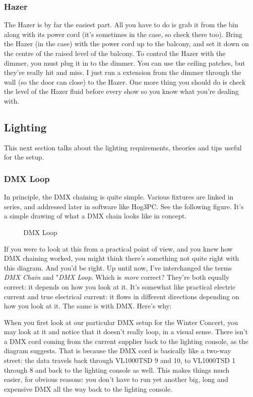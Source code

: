 \documentclass[letterpaper,10pt,oneside,headsepline]{scrreprt}
\begin{document}
\subsubsection{Hazer}
The Hazer is by far the easiest part. All you have to do is grab it from the bin along with its power cord (it's sometimes in the case, so check there too). Bring the Hazer (in the case) with the power cord up to the balcony, and set it down on the centre of the raised level of the balcony. To control the Hazer with the dimmer, you must plug it in to the dimmer. You can use the ceiling patches, but they're really hit and miss. I just run a extension from the dimmer through the wall (so the door can close) to the Hazer. One more thing you should do is check the level of the Hazer fluid before every show so you know what you're dealing with.
\subsection{Lighting}
This next section talks about the lighting requirements, theories and tips useful for the setup.
\subsubsection{DMX Loop}
In principle, the DMX chaining is quite simple. Various fixtures are linked in series, and addressed later in software like Hog3PC. See the following figure. It's a simple drawing of what a DMX chain looks like in concept.
\begin{figure}[ht]
\caption{DMX Loop}
\end{figure}

If you were to look at this from a practical point of view, and you knew how DMX chaining worked, you might think there's something not quite right with this diagram. And you'd be right. Up until now, I've interchanged the terms \textit{DMX Chain} and "\textit{DMX Loop}. Which is \textit{more} correct? They're both equally correct: it depends on how you look at it. It's somewhat like practical electric current and true electrical current: it flows in different directions depending on how you look at it. The same is with DMX. Here's why:

When you first look at our particular DMX setup for the Winter Concert, you may look at it and notice that it doesn't really loop, in a visual sense. There isn't a DMX cord coming from the current supplier back to the lighting console, as the diagram suggests. That is because the DMX cord is basically like a two-way street: the data travels back through VL1000TSD 9 and 10, to VL1000TSD 1 through 8 and back to the lighting console as well. This makes things much easier, for obvious reasons: you don't have to run yet another big, long and expensive DMX all the way back to the lighting console.  
\end{document}

